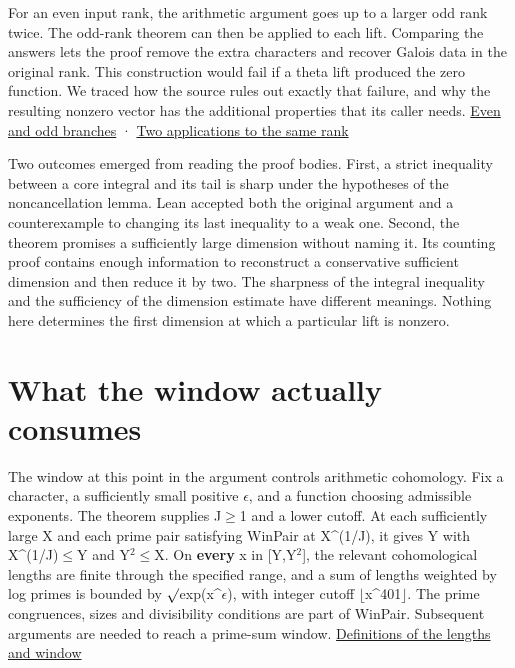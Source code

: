 \documentclass[11pt,letterpaper]{article}
\begin{document}
For an even input rank, the arithmetic argument goes up to a larger odd rank twice. The odd-rank theorem can then be applied to each lift. Comparing the answers lets the proof remove the extra characters and recover Galois data in the original rank. This construction would fail if a theta lift produced the zero function. We traced how the source rules out exactly that failure, and why the resulting nonzero vector has the additional properties that its caller needs. \href{https://github.com/nousentllc/riemann-hypothesis/blob/40e56bab026552e089d7afcfeff08d2defb9c005/src/Development/AutomorphicArithmetic/Foundations/GaloisRepresentations/ThetaParseval/CoreAtQIffRowQ.lean\#L215-L220}{Even and odd branches} · \href{https://github.com/nousentllc/riemann-hypothesis/blob/40e56bab026552e089d7afcfeff08d2defb9c005/src/Development/AutomorphicArithmetic/Foundations/GaloisRepresentations/ThetaParseval/TwoUpOKOfSteps.lean\#L13-L33}{Two applications to the same rank}

Two outcomes emerged from reading the proof bodies. First, a strict inequality between a core integral and its tail is sharp under the hypotheses of the noncancellation lemma. Lean accepted both the original argument and a counterexample to changing its last inequality to a weak one. Second, the theorem promises a sufficiently large dimension without naming it. Its counting proof contains enough information to reconstruct a conservative sufficient dimension and then reduce it by two. The sharpness of the integral inequality and the sufficiency of the dimension estimate have different meanings. Nothing here determines the first dimension at which a particular lift is nonzero.

\section{What the window actually consumes}
The window at this point in the argument controls arithmetic cohomology. Fix a character, a sufficiently small positive \ensuremath{\epsilon}, and a function choosing admissible exponents. The theorem supplies J\ensuremath{\ge}1 and a lower cutoff. At each sufficiently large X and each prime pair satisfying {\ttfamily\small WinPair} at X\textasciicircum{}(1/J), it gives Y with X\textasciicircum{}(1/J)\ensuremath{\le}Y and Y\ensuremath{{}^{2}}\ensuremath{\le}X. On \textbf{every} x in [Y,Y\ensuremath{{}^{2}}], the relevant cohomological lengths are finite through the specified range, and a sum of lengths weighted by log primes is bounded by \ensuremath{\surd}exp(x\textasciicircum{}\ensuremath{\epsilon}), with integer cutoff \ensuremath{\lfloor}x\textasciicircum{}401\ensuremath{\rfloor}. The prime congruences, sizes and divisibility conditions are part of {\ttfamily\small WinPair}. Subsequent arguments are needed to reach a prime-sum window. \href{https://github.com/nousentllc/riemann-hypothesis/blob/40e56bab026552e089d7afcfeff08d2defb9c005/src/Development/AutomorphicArithmetic/CharacterBoxes/ExistsPageN.lean\#L12-L49}{Definitions of the lengths and window}
\end{document}
